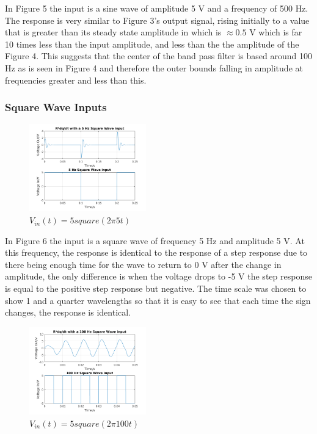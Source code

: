 \documentclass[11pt,a4paper]{article}
\begin{document}
\vspace{2mm}In Figure 5 the input is a sine wave of amplitude 5 V and a frequency of 500 Hz. The response is very similar to Figure 3's output signal, rising initially to a value that is greater than its steady state amplitude in which is $\approx 0.5$ V which is far 10 times less than the input amplitude, and less than the the amplitude of the Figure 4. This suggests that the center of the band pass filter is based around 100 Hz as is seen in Figure 4 and therefore the outer bounds falling in amplitude at frequencies greater and less than this.

\subsubsection{Square Wave Inputs}

\begin{figure}
    \vspace{-40mm}
  		\includegraphics[width=0.45\textwidth]{Ex3_Figs/5Squ1.png}
	\vspace{-6mm}
  	\caption{$V_{in}(t)= 5square(2 \pi 5t)$}
  	\label{fig:ex3g5}
\end{figure}

\vspace{3mm}In Figure 6 the input is a square wave of frequency 5 Hz and amplitude 5 V. At this frequency, the response is identical to the response of a step response due to there being enough time for the wave to return to 0 V after the change in amplitude, the only difference is when the voltage drops to -5 V the step response is equal to the positive step response but negative. The time scale was chosen to show 1 and a quarter wavelengths so that it is easy to see that each time the sign changes, the response is identical.

\begin{figure}
    \vspace{-40mm}
  		\includegraphics[width=0.45\textwidth]{Ex3_Figs/100Squ1.png}
	\vspace{-6mm}
  	\caption{$V_{in}(t)= 5square(2 \pi 100t)$}
  	\label{fig:ex3g6}
\end{figure}
\end{document}
